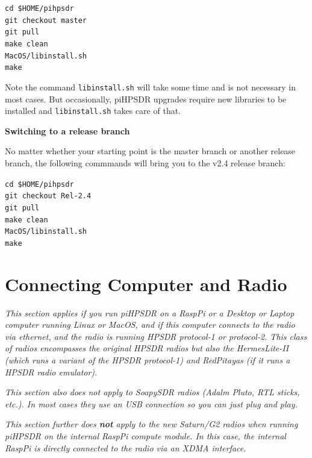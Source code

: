 \documentclass[12pt]{book}
\def\grtt#1{\texttt{\color{magenta}#1}}
\def\pH{pi\-HPSDR\xspace}
\begin{document}
\grtt{cd \$HOME/pihpsdr} \\
\grtt{git checkout master} \\
\grtt{git pull} \\
\grtt{make clean} \\
\grtt{MacOS/libinstall.sh} \\
\grtt{make}

Note the command \texttt{libinstall.sh} will take some time and is not necessary in most cases. But occasionally,
\pH upgrades require new libraries to be installed and \texttt{libinstall.sh} takes care of that.

\medskip
\textbf{Switching to a release branch}

No matter whether your starting point is the master branch or another release branch, the following
commmands will bring you to  the v2.4 release branch:

\grtt{cd \$HOME/pihpsdr} \\
\grtt{git checkout Rel-2.4} \\
\grtt{git pull} \\
\grtt{make clean} \\
\grtt{MacOS/libinstall.sh} \\
\grtt{make}

\chapter[Connecting the Computer and the Radio]{Connecting Computer and Radio}
\label{sec:dhcp}
\textit{This section applies if you run \pH on a
RaspPi or a Desktop or Laptop computer running Linux or MacOS, and if this computer connects to the
radio via ethernet, and the radio is running HPSDR protocol-1 or protocol-2. This class of radios
encompasses the original HPSDR radios but also the HermesLite-II (which runs a variant of the HPSDR
protocol-1) and RedPitayas (if it runs a HPSDR radio emulator).}

\textit{This section also does not apply to SoapySDR radios (Adalm Pluto, RTL sticks, etc.). In most
cases they use an USB connection so you can just plug and play.}

\textit{This section further does \textbf{not} apply to the new Saturn/G2 radios when running \pH on the
internal RaspPi compute module. In this case, the internal RaspPi
is directly connected to the radio via an XDMA interface.}
\end{document}
